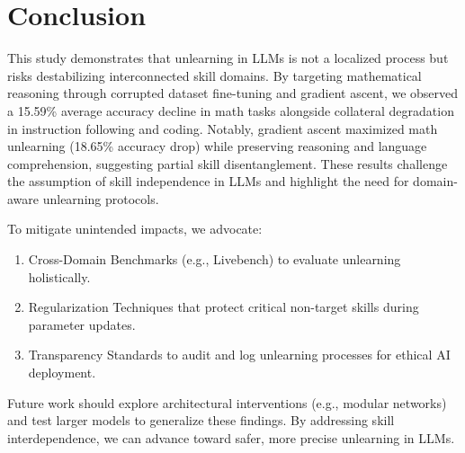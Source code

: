 \documentclass[10.5pt]{article}
\begin{document}
\section{Conclusion}
This study demonstrates that unlearning in LLMs is not a localized process but risks destabilizing interconnected skill domains. By targeting mathematical reasoning through corrupted dataset fine-tuning and gradient ascent, we observed a 15.59\% average accuracy decline in math tasks alongside collateral degradation in instruction following and coding. Notably, gradient ascent maximized math unlearning (18.65\% accuracy drop) while preserving reasoning and language comprehension, suggesting partial skill disentanglement. These results challenge the assumption of skill independence in LLMs and highlight the need for domain-aware unlearning protocols.

To mitigate unintended impacts, we advocate:
\begin{enumerate}
    \item Cross-Domain Benchmarks (e.g., Livebench) to evaluate unlearning holistically.
    \item Regularization Techniques that protect critical non-target skills during parameter updates.
    \item Transparency Standards to audit and log unlearning processes for ethical AI deployment.
\end{enumerate}
Future work should explore architectural interventions (e.g., modular networks) and test larger models to generalize these findings. By addressing skill interdependence, we can advance toward safer, more precise unlearning in LLMs.




\end{document}
